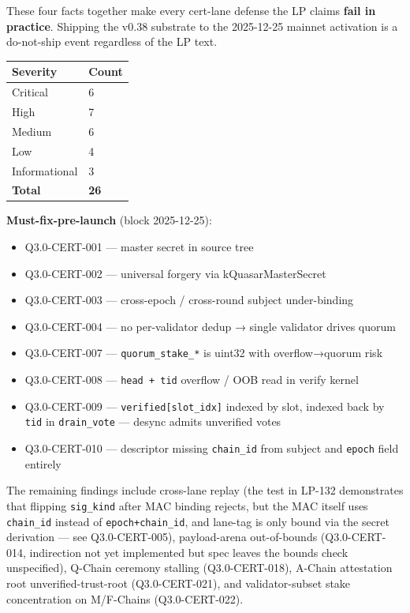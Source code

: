 \documentclass[
]{article}
\newcounter{none} %
\providecommand{\tightlist}{%
  \setlength{\itemsep}{0pt}\setlength{\parskip}{0pt}}
\begin{document}
These four facts together make every cert-lane defense the LP claims
\textbf{fail in practice}. Shipping the v0.38 substrate to the
2025-12-25 mainnet activation is a do-not-ship event regardless of the
LP text.

{\def\LTcaptype{none} %
\begin{longtable}[]{@{}ll@{}}
\toprule\noalign{}
Severity & Count \\
\midrule\noalign{}
\endhead
\bottomrule\noalign{}
\endlastfoot
Critical & 6 \\
High & 7 \\
Medium & 6 \\
Low & 4 \\
Informational & 3 \\
\textbf{Total} & \textbf{26} \\
\end{longtable}
}

\textbf{Must-fix-pre-launch} (block 2025-12-25):

\begin{itemize}
\tightlist
\item
  Q3.0-CERT-001 --- master secret in source tree
\item
  Q3.0-CERT-002 --- universal forgery via kQuasarMasterSecret
\item
  Q3.0-CERT-003 --- cross-epoch / cross-round subject under-binding
\item
  Q3.0-CERT-004 --- no per-validator dedup → single validator drives
  quorum
\item
  Q3.0-CERT-007 --- \texttt{quorum\_stake\_*} is uint32 with
  overflow→quorum risk
\item
  Q3.0-CERT-008 --- \texttt{head\ +\ tid} overflow / OOB read in verify
  kernel
\item
  Q3.0-CERT-009 --- \texttt{verified{[}slot\_idx{]}} indexed by slot,
  indexed back by \texttt{tid} in \texttt{drain\_vote} --- desync admits
  unverified votes
\item
  Q3.0-CERT-010 --- descriptor missing \texttt{chain\_id} from subject
  and \texttt{epoch} field entirely
\end{itemize}

The remaining findings include cross-lane replay (the test in LP-132
demonstrates that flipping \texttt{sig\_kind} after MAC binding rejects,
but the MAC itself uses \texttt{chain\_id} instead of
\texttt{epoch+chain\_id}, and lane-tag is only bound via the secret
derivation --- see Q3.0-CERT-005), payload-arena out-of-bounds
(Q3.0-CERT-014, indirection not yet implemented but spec leaves the
bounds check unspecified), Q-Chain ceremony stalling (Q3.0-CERT-018),
A-Chain attestation root unverified-trust-root (Q3.0-CERT-021), and
validator-subset stake concentration on M/F-Chains (Q3.0-CERT-022).
\end{document}
